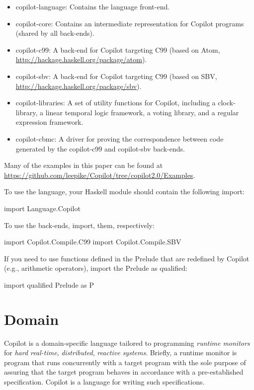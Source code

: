 \documentclass[]{article}
\theoremstyle{example}
\begin{document}
\begin{itemize}
\item copilot-language: Contains the language front-end.
\item copilot-core: Contains an intermediate representation for Copilot programs (shared by all back-ends).
\item copilot-c99: A back-end for Copilot targeting C99 (based on Atom, \url{http://hackage.haskell.org/package/atom}).
\item copilot-sbv: A back-end for Copilot targeting C99 (based on SBV, \url{http://hackage.haskell.org/package/sbv}).
\item copilot-libraries: A set of utility functions for Copilot, including a clock-library, a linear temporal logic framework,
a voting library, and a regular expression framework.
\item copilot-cbmc: A driver for proving the correspondence between code
  generated by the copilot-c99 and copilot-sbv back-ends.
\end{itemize}

Many of the examples in this paper can be found at
\url{https://github.com/leepike/Copilot/tree/copilot2.0/Examples}.

To use the language, your Haskell module should contain the following import:
%
\begin{code}
import Language.Copilot  
\end{code}
%
To use the back-ends, import, them, respectively:
%
\begin{code}
import Copilot.Compile.C99
import Copilot.Compile.SBV
\end{code}
%
If you need to use functions defined in the Prelude that are redefined by
Copilot (e.g., arithmetic operators), import the Prelude as qualified:
%
\begin{code}
import qualified Prelude as P  
\end{code}

\section{Domain}

Copilot is a domain-specific language tailored to programming \emph{runtime
monitors} for \emph{hard real-time}, \emph{distributed}, \emph{reactive systems}.
Briefly, a runtime monitor is program that runs concurrently with a target program
with the sole purpose of assuring that the target program behaves in accordance with a
pre-established specification. Copilot is a language for writing such specifications.
\end{document}
